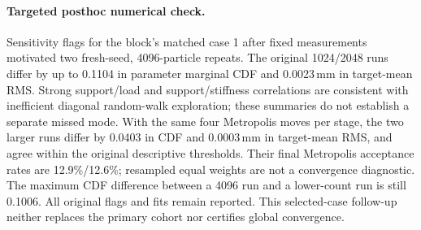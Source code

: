 \paragraph{Targeted posthoc numerical check.} Sensitivity flags for the block's matched case 1 after fixed measurements motivated two fresh-seed, 4096-particle repeats. The original 1024/2048 runs differ by up to 0.1104 in parameter marginal CDF and 0.0023\,mm in target-mean RMS. Strong support/load and support/stiffness correlations are consistent with inefficient diagonal random-walk exploration; these summaries do not establish a separate missed mode. With the same four Metropolis moves per stage, the two larger runs differ by 0.0403 in CDF and 0.0003\,mm in target-mean RMS, and agree within the original descriptive thresholds. Their final Metropolis acceptance rates are 12.9\%/12.6\%; resampled equal weights are not a convergence diagnostic. The maximum CDF difference between a 4096 run and a lower-count run is still 0.1006. All original flags and fits remain reported. This selected-case follow-up neither replaces the primary cohort nor certifies global convergence.
